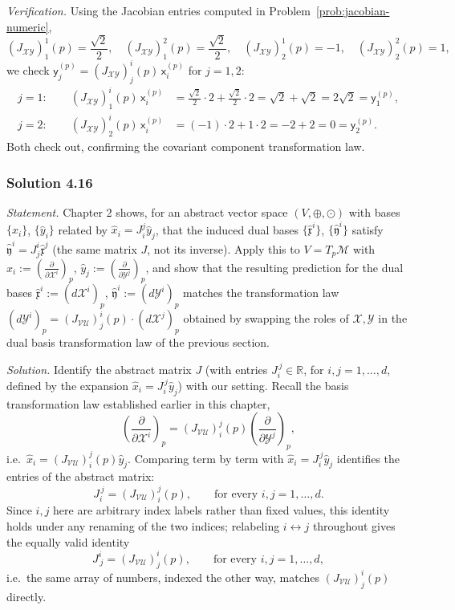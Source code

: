 \documentclass[11pt]{article}
\begin{document}
\emph{Verification.} Using the Jacobian entries computed in
Problem~\ref{prob:jacobian-numeric},
\[
(J_{\mathcal{XY}})^1_1(p)=\frac{\sqrt2}{2},\quad
(J_{\mathcal{XY}})^2_1(p)=\frac{\sqrt2}{2},\quad
(J_{\mathcal{XY}})^1_2(p)=-1,\quad (J_{\mathcal{XY}})^2_2(p)=1,
\]
we check $\mathsf y_j^{(p)}=(J_{\mathcal{XY}})^i_j(p)\,\mathsf
x_i^{(p)}$ for $j=1,2$:
\begin{align*}
j=1:\qquad (J_{\mathcal{XY}})^i_1(p)\,\mathsf x_i^{(p)} &=
\frac{\sqrt2}{2}\cdot2 + \frac{\sqrt2}{2}\cdot2 = \sqrt2+\sqrt2 = 2\sqrt2 =
\mathsf y_1^{(p)},\\
j=2:\qquad (J_{\mathcal{XY}})^i_2(p)\,\mathsf x_i^{(p)} &=
(-1)\cdot2 + 1\cdot2 = -2+2 = 0 = \mathsf y_2^{(p)}.
\end{align*}
Both check out, confirming the covariant component transformation law.

\subsubsection*{Solution 4.16}

\noindent\textit{Statement.} Chapter 2 shows, for an abstract vector space
$(V,\oplus,\odot)$ with bases $\{\hat x_i\}$, $\{\hat y_i\}$ related by
$\hat x_i= J_i^j\hat y_j$, that the induced dual bases
$\{\hat{\mathfrak x}^i\}$, $\{\hat{\mathfrak y}^i\}$ satisfy
$\hat{\mathfrak y}^i= J^i_j\hat{\mathfrak x}^j$ (the same matrix $J$,
not its inverse). Apply this to $V=T_p\mathcal M$ with $\hat
x_i:=\left(\frac{\partial}{\partial\mathcal X^i}\right)_p$, $\hat
y_j:=\left(\frac{\partial}{\partial\mathcal Y^j}\right)_p$, and show that
the resulting prediction for the dual bases $\hat{\mathfrak x}^i:=(d
\mathcal X^i)_p$, $\hat{\mathfrak y}^i:=(d\mathcal Y^i)_p$ matches the
transformation law $(d\mathcal Y^i)_p=(J_{\mathcal{VU}})^i_j(p)\cdot
(d\mathcal X^j)_p$ obtained by swapping the roles of $\mathcal X,\mathcal
Y$ in the dual basis transformation law of the previous section.

\medskip
\noindent\textit{Solution.} Identify the abstract matrix $J$ (with entries
$J_i^{\,j}\in\mathbb R$, for $i,j=1,\dots,d$, defined by the expansion
$\hat x_i= J_i^{\,j}\hat y_j$) with our setting. Recall the basis
transformation law established earlier in this chapter,
\[
\left(\frac{\partial}{\partial\mathcal X^i}\right)_p =
(J_{\mathcal{VU}})^j_i(p)\left(\frac{\partial}{\partial
\mathcal Y^j}\right)_p,
\]
i.e.\ $\hat x_i=(J_{\mathcal{VU}})^j_i(p)\hat y_j$. Comparing term by
term with $\hat x_i= J_i^{\,j}\hat y_j$ identifies the entries of the
abstract matrix:
\[
J_i^{\,j} = (J_{\mathcal{VU}})^j_i(p), \qquad\text{for every }
i,j=1,\dots,d.
\]
Since $i,j$ here are arbitrary index labels rather than fixed values, this
identity holds under any renaming of the two indices; relabeling
$i\leftrightarrow j$ throughout gives the equally valid identity
\[
J^i_{\,j} = (J_{\mathcal{VU}})^i_j(p), \qquad\text{for every }
i,j=1,\dots,d,
\]
i.e.\ the same array of numbers, indexed the other way, matches
$(J_{\mathcal{VU}})^i_j(p)$ directly.
\end{document}
